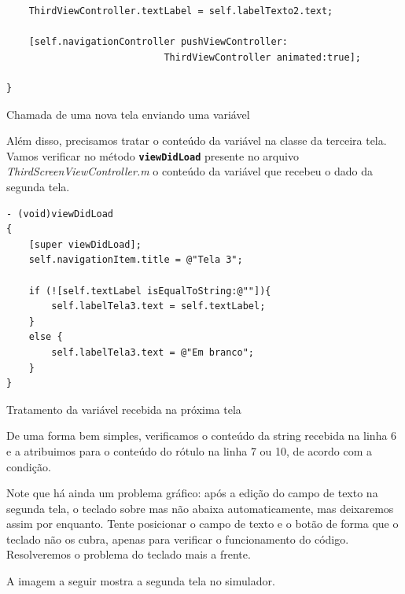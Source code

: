 \documentclass[a4paper,12pt,brazil,doubleside]{book}
\begin{document}
\begin{singlespace}
\begin{listing}[H]
\begin{verbatim}
    ThirdViewController.textLabel = self.labelTexto2.text;
    
    [self.navigationController pushViewController:
    						ThirdViewController animated:true];
    
}
\end{verbatim}
\caption{Chamada de uma nova tela enviando uma variável}
\end{listing}


Além disso, precisamos tratar o conteúdo da variável na classe da terceira tela. Vamos verificar no método \texttt{\textbf{viewDidLoad}} presente no arquivo \emph{ThirdScreenViewController.m} o conteúdo da variável que recebeu o dado da segunda tela.

\begin{listing}[H]
\begin{verbatim}
- (void)viewDidLoad
{
    [super viewDidLoad];
    self.navigationItem.title = @"Tela 3";
    
    if (![self.textLabel isEqualToString:@""]){
        self.labelTela3.text = self.textLabel;
    }
    else {
        self.labelTela3.text = @"Em branco";
    }
}
\end{verbatim}
\caption{Tratamento da variável recebida na próxima tela}
\end{listing}


De uma forma bem simples, verificamos o conteúdo da string recebida na linha 6 e a atribuimos para o conteúdo do rótulo na linha 7 ou 10, de acordo com a condição.

Note que há ainda um problema gráfico: após a edição do campo de texto na segunda tela, o teclado sobre mas não abaixa automaticamente, mas deixaremos assim por enquanto. Tente posicionar o campo de texto e o botão de forma que o teclado não os cubra, apenas para verificar o funcionamento do código. Resolveremos o problema do teclado mais a frente.

A imagem a seguir mostra a segunda tela no simulador.

\bigskip
\bigskip


\end{singlespace}
\end{document}
